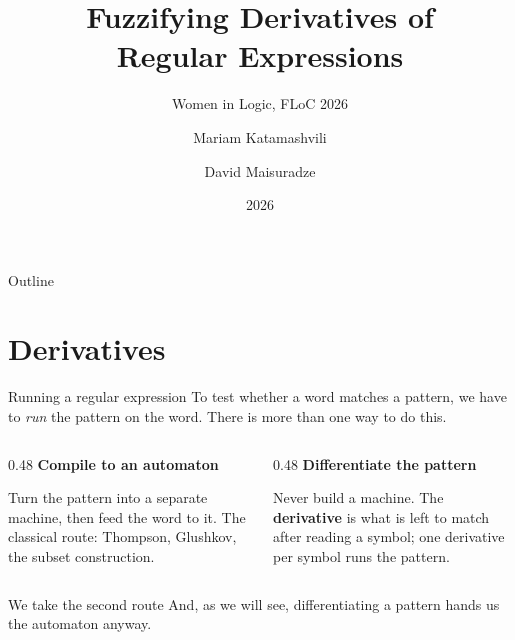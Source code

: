 \documentclass[aspectratio=169]{beamer}
\title[Fuzzifying Derivatives]{Fuzzifying Derivatives of\\Regular Expressions}
\subtitle{Women in Logic, FLoC 2026}
\author[Katamashvili, Maisuradze]{Mariam Katamashvili \and David Maisuradze}
\institute[VIAM, KIU]{Kutaisi International University \\ Vekua Institute of Applied Mathematics, TSU}
\date{2026}
\begin{document}
\begin{frame}
  \titlepage
\end{frame}

\begin{frame}{Outline}
  \tableofcontents
\end{frame}

\section{Derivatives}

\begin{frame}{Running a regular expression}
  To test whether a word matches a pattern, we have to \emph{run} the pattern on
  the word. There is more than one way to do this.
  \vfill
  \begin{columns}[T,onlytextwidth]
    \begin{column}{0.48\textwidth}
      \textbf{Compile to an automaton}
      \medskip

      Turn the pattern into a separate machine, then feed the word to it. The
      classical route: Thompson, Glushkov, the subset construction.
    \end{column}
    \begin{column}{0.48\textwidth}
      \textbf{Differentiate the pattern}
      \medskip

      Never build a machine. The \textbf{derivative} is what is left to match
      after reading a symbol; one derivative per symbol runs the pattern.
    \end{column}
  \end{columns}
  \vfill
  \begin{block}{We take the second route}
    And, as we will see, differentiating a pattern hands us the automaton
    anyway.
  \end{block}
\end{frame}
\end{document}
